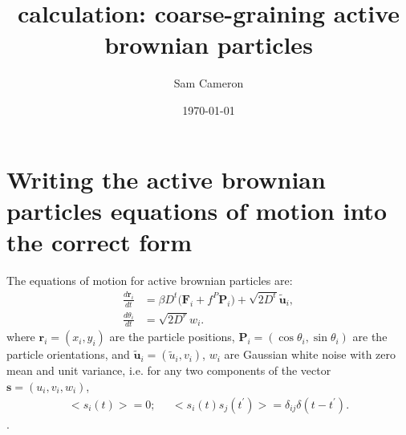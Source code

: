 \documentclass[twocolumn,amsmath,amssymb,aps]{revtex4-1}%
\begin{document}
 
\title{calculation: coarse-graining active brownian particles}
\author{Sam Cameron}
%
\date{\today}

\begin{abstract}
\end{abstract}

\maketitle

\section{Writing the active brownian particles equations of motion into
  the correct form}

The equations of motion for active brownian particles are:
\begin{subequations}
  \label{eqs:basicABPsODEs}
  \begin{align}
    \frac{d\bm{r}_i}{dt}&=\beta D^t\big(\bm{F}_i
    +f^P\bm{P}_i\big)
    +\sqrt{2D^t}\tilde{\bm{u}}_i,\label{eq:micro_pos}\\
    \frac{d\theta_i}{dt}&=\sqrt{2D^r}w_i.\label{eq:micro_theta}
  \end{align}
\end{subequations}
where $\bm{r}_i=(x_i,y_i)$ are the particle positions,
$\bm{P}_i=(\cos\theta_i,\sin\theta_i)$ are the particle orientations,
and $\tilde{\bm{u}}_i=(\tilde{u}_i,v_i)$, $w_i$ are Gaussian white noise
with zero mean and unit variance, i.e. for any two components of the vector
$\bm{s}=(u_i,v_i,w_i)$,
\begin{align}
  \big<s_i(t)\big>=0;\;\;\;\;\; \big<s_i(t)s_j(t^{\prime})\big>=
  \delta_{ij}\delta(t-t^{\prime}).
\end{align}.
\end{document}
